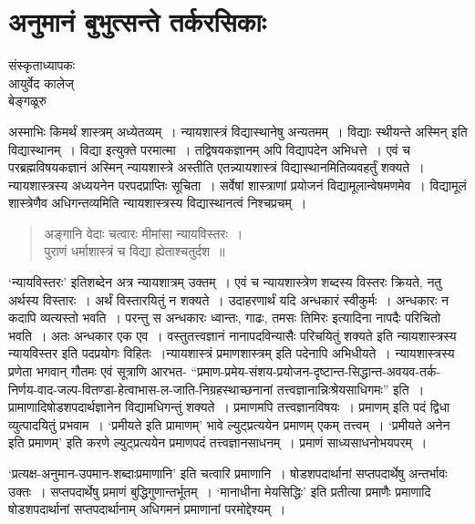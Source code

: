 {\fontsize{15}{17}\selectfont
\presetvalues
\chapter{अनुमानं बुभुत्सन्ते  तर्करसिकाः}

\begin{center}
\smallskip
संस्कृताध्यापकः\\
आयुर्वेद कालेज्\\ 
बेङ्गळूरु
\addrule
\end{center}

अस्माभिः किमर्थं शास्त्रम् अध्येतव्यम्~। न्यायशास्त्रं विद्यास्थानेषु अन्यतमम्~। विद्याः स्थीयन्ते अस्मिन् इति विद्यास्थानम्~। विद्या इत्युक्ते परमात्मा~। तद्विषयकज्ञानम् अपि विद्यापदेन अभिधत्ते~। एवं च परब्रह्मविषयकज्ञानं अस्मिन् न्यायशास्त्रे अस्तीति एतन्न्यायशास्त्रं विद्यास्थानमितिव्यवहर्तुं शक्यते~। न्यायशास्त्रस्य अध्ययनेन परपदप्राप्तिः सूचिता~। सर्वेषां शास्त्राणां प्रयोजनं विद्यामूलान्वेषमणमेव~। विद्यामूलं शास्त्रेणैव अधिगन्तव्यमिति न्यायशास्त्रस्य विद्यास्थानत्वं निश्चप्रचम्~। 
\begin{verse}
अङ्गानि वेदाः चत्वारः मीमांसा न्यायविस्तरः~। \\
पुराणं धर्माशास्त्रं च विद्या ह्येताश्चतुर्दश~॥
\end{verse}
‘न्यायविस्तरः’ इतिशब्देन अत्र न्यायशात्रम् उक्तम्~। एवं च न्यायशास्त्रेण शब्दस्य विस्तरः क्रियते, नतु अर्थस्य विस्तारः~। अर्थं विस्तारयितुं न शक्यते~। उदाहरणार्थं यदि अन्धकारं स्वीकुर्मः~। अन्धकारः न कदापि व्यत्यस्तो भवति~। परन्तु स अन्धकारः ध्वान्तः, गाढः, \hbox{तमसः} तिमिरः इत्यादिना नापदैः परिचितो भवति~। अतः अन्धकार एक एव~। वस्तुतत्त्वज्ञानं नानापदविन्यासैः परिचयितुं शक्यते इति न्यायशास्त्रस्य न्यायविस्तर इति पदप्रयोगः विहितः~।\break न्यायशास्त्रं प्रमाणशास्त्रम् इति पदेनापि अभिधीयते~।  न्यायशास्त्रस्य प्रणेता भगवान् गौतमः एवं सूत्राणि आरभत- “प्रमाण-प्रमेय-संशय-प्रयोजन-दृष्टान्त-सिद्धान्त-अवयव-तर्क-निर्णय-वाद-जल्प-वितण्डा-हेत्वाभास-ल-जाति-निग्रहस्थाच्छनानां तत्त्वज्ञानान्निःश्रेयसाधिगमः” इति~। प्रामाणादिषोडशपदार्थज्ञानेन विद्यामधिगन्तुं शक्यते~। प्रमाणमपि तत्त्वज्ञानविषयः~। प्रमाणम् इति पदं द्विधा व्युत्पादयितुं प्रभवाम~। ‘प्रमीयते इति प्रामाणम्’ भावे ल्युट्प्रत्ययेन प्रमाणम् एकम् तत्त्वम्~। ‘प्रमीयते अनेन इति प्रमाणम्’ इति करणे ल्युट्प्रत्ययेन प्रमाणपदं तत्त्वज्ञानसाधनम्~। प्रमाणं साध्यसाधनोभयपरम्~। 

‘प्रत्यक्ष-अनुमान-उपमान-शब्दाःप्रमाणानि’ इति चत्वारि प्रमाणानि~। षोडशपदार्थानां सप्तपदार्थेषु अन्तर्भावः उक्तः~। सप्तपदार्थेषु प्रमाणं बुद्धिगुणान्तर्भूतम्~। ‘मानाधीना मेयसिद्धिः’ इति प्रतीत्या प्रमाणैः प्रमाणादि षोडशपदार्थानां सप्तपदार्थानाम् अधिगमनं प्रमाणानां परमोद्देश्यम्~। 

}
